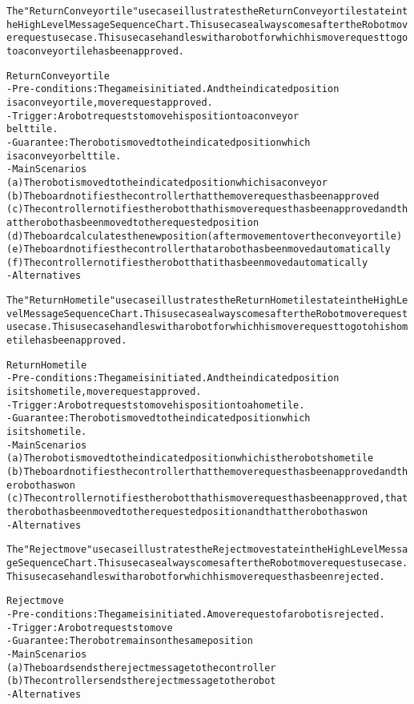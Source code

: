 \begin{alltt}
The "Return Conveyor tile" use case illustrates the Return Conveyor tile state in the High Level Message Sequence Chart. This use case always comes after the Robot move request use case. This use case handles with a robot for which his move request to go to a conveyor tile has been approved.

Return Conveyor tile
- Pre-conditions: The game is initiated. And the indicated position
    is a conveyor tile, move request approved.
- Trigger: A robot requests to move his position to a conveyor
    belt tile.
- Guarantee: The robot is moved to the indicated position which
    is a conveyor belt tile.
- Main Scenarios
    (a) The robot is moved to the indicated position which is a conveyor
    (b) The board notifies the controller that the move request has been approved
    (c) The controller notifies the robot that his move request has been approved and that the robot has been moved to the requested position
    (d) The board calculates the new position (after movement over the conveyor tile)
    (e) The board notifies the controller that a robot has been moved automatically
    (f) The controller notifies the robot that it has been moved automatically
- Alternatives

The "Return Home tile" use case illustrates the Return Home tile state in the High Level Message Sequence Chart. This use case always comes after the Robot move request use case. This use case handles with a robot for which his move request to go to his home tile has been approved.
        
Return Home tile
- Pre-conditions: The game is initiated. And the indicated position
    is its home tile, move request approved.
- Trigger: A robot requests to move his position to a home tile.
- Guarantee: The robot is moved to the indicated position which
    is its home tile.
- Main Scenarios
    (a) The robot is moved to the indicated position which is the robots home tile
    (b) The board notifies the controller that the move request has been approved and the robot has won
    (c) The controller notifies the robot that his move request has been approved, that the robot has been moved to the requested position and that the robot has won
- Alternatives

The "Reject move" use case illustrates the Reject move state in the High Level Message Sequence Chart. This use case always comes after the Robot move request use case. This use case handles with a robot for which his move request has been rejected.

Reject move
- Pre-conditions: The game is initiated. A move request of a robot is rejected.
- Trigger: A robot requests to move
- Guarantee: The robot remains on the same position
- Main Scenarios
    (a) The board sends the reject message to the controller
    (b) The controller sends the reject message to the robot
- Alternatives


\end{alltt}
